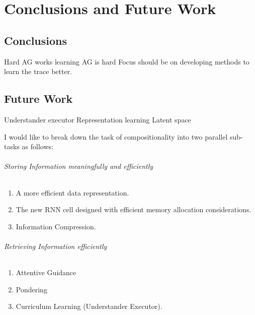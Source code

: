 \chapter{Conclusions and Future Work}%

\section{Conclusions}
Hard AG works
learning AG is hard
Focus should be on developing methods to learn the trace better.



\section{Future Work}
Understander executor
Representation learning
Latent space

I would like to break down the task of compositionality into two parallel sub-tasks as follows:

\subparagraph{Storing Information meaningfully and efficiently}
\begin{enumerate}
	\item A more efficient data representation.
	\item The new RNN cell designed with efficient memory allocation considerations.
	\item Information Compression.		
\end{enumerate}
\subparagraph{Retrieving Information efficiently}
\begin{enumerate}
	\item Attentive Guidance	
	\item Pondering
	\item Curriculum Learning (Understander Executor).
\end{enumerate}